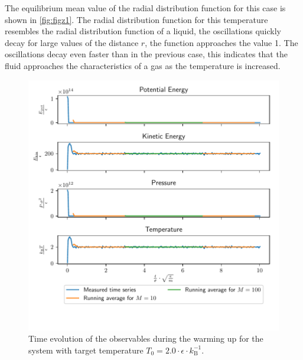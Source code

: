 \documentclass[a4paper,10pt,bibtotoc]{scrartcl}
\begin{document}
The equilibrium mean value of the radial distribution function for this case is shown in \autoref{fig:figz1}. 
The radial distribution function for this temperature resembles the radial distribution function of a liquid, the oscillations quickly decay for large values of the distance $r$, the function approaches the value 1.
The oscillations decay even faster than in the previous case, this indicates that the fluid approaches the characteristics of a gas as the temperature is increased.
\begin{figure}
        \centering
        \includegraphics[width=\linewidth]{warm2.pdf}
    \caption{Time evolution of the observables during the warming up for the system with target temperature $T_0 = 2.0\cdot \epsilon\cdot k_\mathrm{B}^{-1}$.}
    \label{fig:figz-1}
\end{figure}
\end{document}

